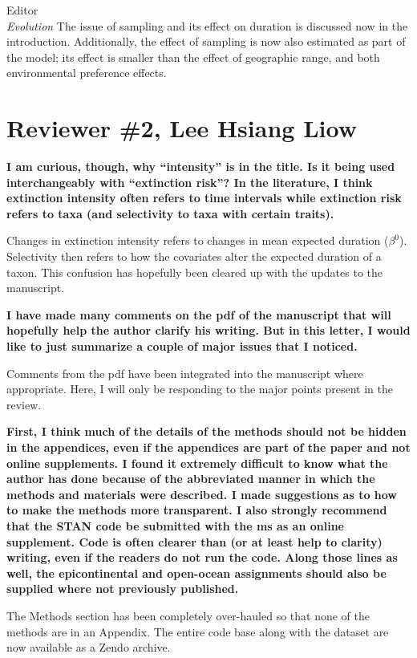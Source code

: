 \documentclass{letter}
\begin{document}
\begin{letter}{Editor \\ \textit{Evolution}}
  The issue of sampling and its effect on duration is discussed now in the introduction. Additionally, the effect of sampling is now also estimated as part of the model; its effect is smaller than the effect of geographic range, and both environmental preference effects.


  \section{Reviewer \#2, Lee Hsiang Liow}
  \textbf{I am curious, though, why “intensity” is in the title. Is it being used interchangeably with “extinction risk”? In the literature, I think extinction intensity often refers to time intervals while extinction risk refers to taxa (and selectivity to taxa with certain traits).}

  Changes in extinction intensity refers to changes in mean expected duration (\(\beta^{0}\)). Selectivity then refers to how the covariates alter the expected duration of a taxon. This confusion has hopefully been cleared up with the updates to the manuscript.
  
  \textbf{I have made many comments on the pdf of the manuscript that will hopefully help the author clarify his writing. But in this letter, I would like to just summarize a couple of major issues that I noticed.}

  Comments from the pdf have been integrated into the manuscript where appropriate. Here, I will only be responding to the major points present in the review.
  
  \textbf{First, I think much of the details of the methods should not be hidden in the appendices, even if the appendices are part of the paper and not online supplements. I found it extremely difficult to know what the author has done because of the abbreviated manner in which the methods and materials were described. I made suggestions as to how to make the methods more transparent. I also strongly recommend that the STAN code be submitted with the ms as an online supplement. Code is often clearer than (or at least help to clarity) writing, even if the readers do not run the code. Along those lines as well, the epicontinental and open-ocean assignments should also be supplied where not previously published. }

  The Methods section has been completely over-hauled so that none of the methods are in an Appendix. The entire code base along with the dataset are now available as a Zendo archive. 
  

\end{letter}
\end{document}
